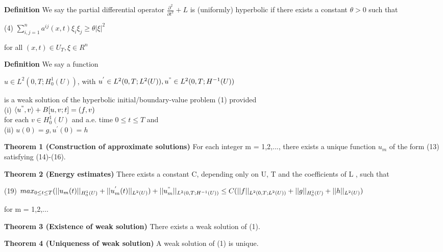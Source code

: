 \documentclass{article}
\newcommand\tab[1][1cm]{\hspace*{#1}}
\begin{document}
\textbf {Definition} We say the partial differential operator $\frac{\partial^2}{\partial t^2} + L$ is (uniformly) hyperbolic if there exists a constant $\theta > 0$ such that
\begin{center}
(4) \tab $\sum_{i,j=1}^n a^{ij}(x,t) \xi_i \xi_j \geq \theta |\xi|^2$
\end{center}
for all $(x,t) \in U_T, \xi \in R^n$

\textbf {Definition} We say a function
\begin{center}
$u \in L^2(0, T; H_0^1(U))$, with $u^{'} \in L^2(0, T; L^2(U)), u^{"} \in L^2(0, T; H^{-1}(U))$
\end{center}
is a weak solution of the hyperbolic initial/boundary-value problem (1) provided \\
\tab (i) $\langle u^{"}, v \rangle + B[u, v; t] = (f,v)$ \\
for each $v \in H_0^1(U)$ and a.e. time $0 \leq t \leq T$ and \\
\tab (ii) $u(0) = g, u^{'}(0) = h$

\textbf {Theorem 1 (Construction of approximate solutions)} For each integer m = 1,2,..., there exists a unique function $u_m$ of the form (13) satisfying (14)-(16).

\textbf {Theorem 2 (Energy estimates)} There exists a constant C, depending only on U, T and the coefficients of L , such that
\begin{center}
(19) \tab \tab 
$max_{0 \leq t \leq T} (||u_m(t)||_{H_{0}^{1}(U)} + ||u^{'}_{m}(t)||_{L^{2}(U)}) + ||u^{"}_{m}||_{L^{2}(0, T; H^{-1}(U))} \leq C( ||f||_{L^{2}(0, T; L^{2}(U))} + ||g||_{H_{0}^{1}(U)} + ||h||_{L^{2}(U)})$ 
\end{center}
for m = 1,2,...

\textbf {Theorem 3 (Existence of weak solution)} There exists a weak solution of (1).

\textbf {Theorem 4 (Uniqueness of weak solution)} A weak solution of (1) is unique.
\end{document}
